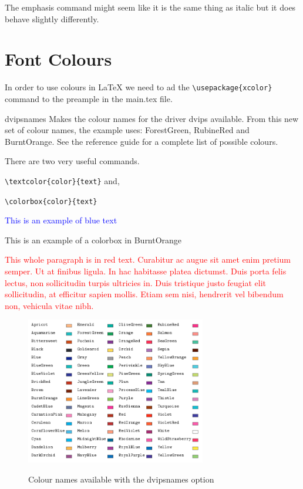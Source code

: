 \vspace{0.4cm}

The emphasis command might seem like it is the same thing as italic but it does behave slightly differently. 

\newpage

\section{Font Colours}

In order to use colours in LaTeX we need to ad the \verb|\usepackage{xcolor}| command to the preample in the main.tex file. 

dvipsnames Makes the colour names for the driver dvips available. From this new set of colour names, the example uses: ForestGreen, RubineRed and BurntOrange. See the reference guide for a complete list of possible colours.

There are two very useful commands. 

\verb|\textcolor{color}{text}| and, 

\verb|\colorbox{color}{text}|

\textcolor{blue}{This is an example of blue text}

\colorbox{BurntOrange}{This is an example of a colorbox in BurntOrange}

\textcolor{red}{This whole paragraph is in red text. Curabitur ac augue sit amet enim pretium semper. Ut at finibus ligula. In hac habitasse platea dictumst. Duis porta felis lectus, non sollicitudin turpis ultricies in. Duis tristique justo feugiat elit sollicitudin, at efficitur sapien mollis. Etiam sem nisi, hendrerit vel bibendum non, vehicula vitae nibh.}

\vspace{0.4cm}

\begin{figure}[h]
\centering
\includegraphics[width=0.7\textwidth]{images/ColoursEx6.png}
\caption{Colour names available with the dvipsnames option}
\label{fig:x Color options} \parencite{overleaf01}
\end{figure}


